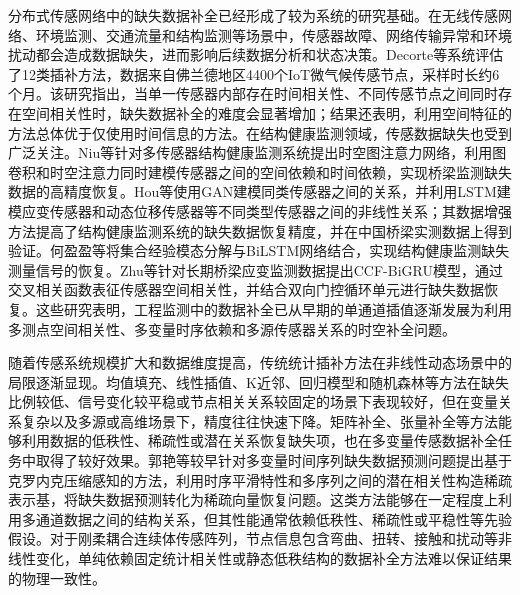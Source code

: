 分布式传感网络中的缺失数据补全已经形成了较为系统的研究基础。在无线传感网络、环境监测、交通流量和结构监测等场景中，传感器故障、网络传输异常和环境扰动都会造成数据缺失，进而影响后续数据分析和状态决策。Decorte等系统评估了12类插补方法，数据来自佛兰德地区4400个IoT微气候传感节点，采样时长约6个月。该研究指出，当单一传感器内部存在时间相关性、不同传感节点之间同时存在空间相关性时，缺失数据补全的难度会显著增加；结果还表明，利用空间特征的方法总体优于仅使用时间信息的方法\cite{decorte2024missing}。在结构健康监测领域，传感数据缺失也受到广泛关注。Niu等针对多传感器结构健康监测系统提出时空图注意力网络，利用图卷积和时空注意力同时建模传感器之间的空间依赖和时间依赖，实现桥梁监测缺失数据的高精度恢复\cite{niu2022restoration}。Hou等使用GAN建模同类传感器之间的关系，并利用LSTM建模应变传感器和动态位移传感器等不同类型传感器之间的非线性关系；其数据增强方法提高了结构健康监测系统的缺失数据恢复精度，并在中国桥梁实测数据上得到验证\cite{hou2022deep}。何盈盈等将集合经验模态分解与BiLSTM网络结合，实现结构健康监测缺失测量信号的恢复\cite{he2025eemd_bilstm}。Zhu等针对长期桥梁应变监测数据提出CCF-BiGRU模型，通过交叉相关函数表征传感器空间相关性，并结合双向门控循环单元进行缺失数据恢复\cite{zhu2025spatiotemporal}。这些研究表明，工程监测中的数据补全已从早期的单通道插值逐渐发展为利用多测点空间相关性、多变量时序依赖和多源传感器关系的时空补全问题。

随着传感系统规模扩大和数据维度提高，传统统计插补方法在非线性动态场景中的局限逐渐显现。均值填充、线性插值、K近邻、回归模型和随机森林等方法在缺失比例较低、信号变化较平稳或节点相关关系较固定的场景下表现较好，但在变量关系复杂以及多源或高维场景下，精度往往快速下降。矩阵补全、张量补全等方法能够利用数据的低秩性、稀疏性或潜在关系恢复缺失项，也在多变量传感数据补全任务中取得了较好效果。郭艳等较早针对多变量时间序列缺失数据预测问题提出基于克罗内克压缩感知的方法，利用时序平滑特性和多序列之间的潜在相关性构造稀疏表示基，将缺失数据预测转化为稀疏向量恢复问题\cite{guo2019kronecker}。这类方法能够在一定程度上利用多通道数据之间的结构关系，但其性能通常依赖低秩性、稀疏性或平稳性等先验假设。对于刚柔耦合连续体传感阵列，节点信息包含弯曲、扭转、接触和扰动等非线性变化，单纯依赖固定统计相关性或静态低秩结构的数据补全方法难以保证结果的物理一致性。

